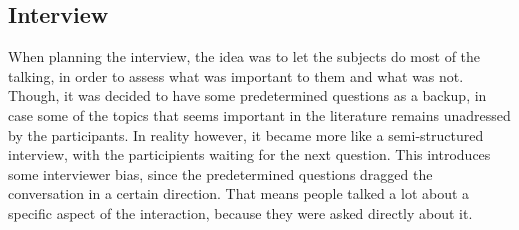 \subsection{Interview}
When planning the interview, the idea was to let the subjects do most of the talking, in order to assess what was important to them and what was not. Though, it was decided to have some predetermined questions as a backup, in case some of the topics that seems important in the literature remains unadressed by the participants. In reality however, it became more like a semi-structured interview, with the participients waiting for the next question. This introduces some interviewer bias, since the predetermined questions dragged the conversation in a certain direction. That means people talked a lot about a specific aspect of the interaction, because they were asked directly about it.